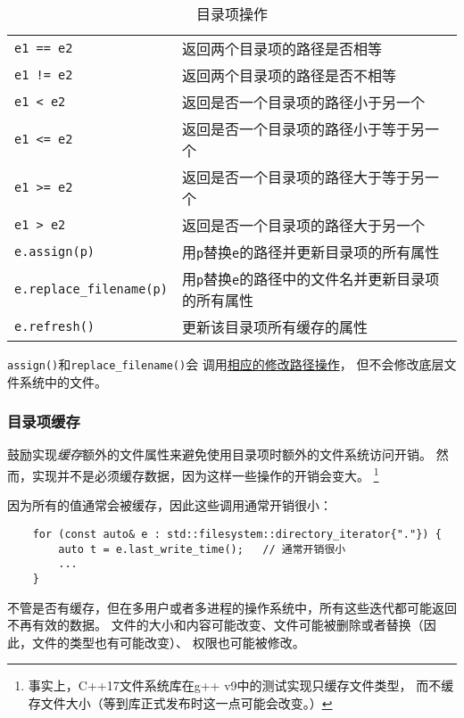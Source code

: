 \begin{table}[htb]
\begin{tabular}{l|l}
        \texttt{e1 == e2}                & 返回两个目录项的路径是否相等                             \\
        \texttt{e1 != e2}                & 返回两个目录项的路径是否不相等                            \\
        \texttt{e1 < e2}                 & 返回是否一个目录项的路径小于另一个                          \\
        \texttt{e1 <= e2}                & 返回是否一个目录项的路径小于等于另一个                        \\
        \texttt{e1 >= e2}                & 返回是否一个目录项的路径大于等于另一个                        \\
        \texttt{e1 > e2}                 & 返回是否一个目录项的路径大于另一个                          \\
        \texttt{e.assign(p)}             & 用\texttt{p}替换\texttt{e}的路径并更新目录项的所有属性      \\
        \texttt{e.replace\_filename(p)}  & 用\texttt{p}替换\texttt{e}的路径中的文件名并更新目录项的所有属性 \\
        \texttt{e.refresh()}             & 更新该目录项所有缓存的属性                              \\
        \hline
    \end{tabular}
    \caption{目录项操作}
    \label{t20.22}
\end{table}

\texttt{assign()}和\texttt{replace\_filename()}会
调用\hyperref[ch20.3.5]{相应的修改路径操作}，
但不会修改底层文件系统中的文件。

\subsubsection{目录项缓存}
鼓励实现\emph{缓存}额外的文件属性来避免使用目录项时额外的文件系统访问开销。
然而，实现并不是必须缓存数据，因为这样一些操作的开销会变大。
\footnote{事实上，C++17文件系统库在g++ v9中的测试实现只缓存文件类型，
而不缓存文件大小（等到库正式发布时这一点可能会改变。）}

因为所有的值通常会被缓存，因此这些调用通常开销很小：
\begin{lstlisting}
    for (const auto& e : std::filesystem::directory_iterator{"."}) {
        auto t = e.last_write_time();   // 通常开销很小
        ...
    }
\end{lstlisting}
不管是否有缓存，但在多用户或者多进程的操作系统中，所有这些迭代都可能返回不再有效的数据。
文件的大小和内容可能改变、文件可能被删除或者替换（因此，文件的类型也有可能改变）、
权限也可能被修改。

